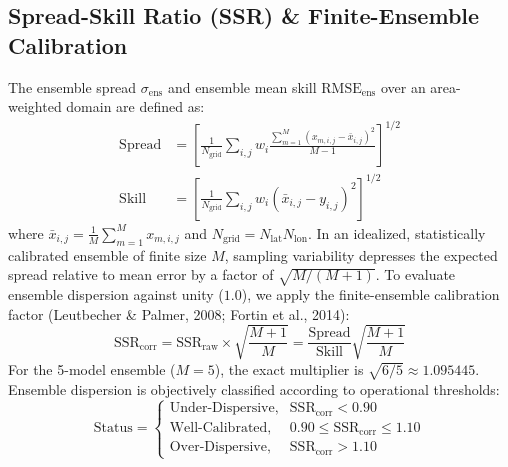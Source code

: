 \documentclass[10pt,twocolumn,letterpaper]{article}
\begin{document}
\subsection{Spread-Skill Ratio (SSR) \& Finite-Ensemble Calibration}
The ensemble spread $\sigma_\mathrm{ens}$ and ensemble mean skill $\mathrm{RMSE}_\mathrm{ens}$ over an area-weighted domain are defined as:
\begin{align}
\mathrm{Spread} &= \left[ \frac{1}{N_\mathrm{grid}} \sum_{i,j} w_i \frac{\sum_{m=1}^M (x_{m, i, j} - \bar{x}_{i,j})^2}{M-1} \right]^{1/2} \\
\mathrm{Skill} &= \left[ \frac{1}{N_\mathrm{grid}} \sum_{i,j} w_i (\bar{x}_{i,j} - y_{i,j})^2 \right]^{1/2}
\end{align}
where $\bar{x}_{i,j} = \frac{1}{M}\sum_{m=1}^M x_{m,i,j}$ and $N_\mathrm{grid} = N_\mathrm{lat} N_\mathrm{lon}$. In an idealized, statistically calibrated ensemble of finite size $M$, sampling variability depresses the expected spread relative to mean error by a factor of $\sqrt{M/(M+1)}$. To evaluate ensemble dispersion against unity ($1.0$), we apply the finite-ensemble calibration factor (Leutbecher \& Palmer, 2008; Fortin et al., 2014):
\begin{equation}
\mathrm{SSR}_\mathrm{corr} = \mathrm{SSR}_\mathrm{raw} \times \sqrt{\frac{M+1}{M}} = \frac{\mathrm{Spread}}{\mathrm{Skill}} \sqrt{\frac{M+1}{M}}
\label{eq:ssr_corr}
\end{equation}
For the 5-model ensemble ($M=5$), the exact multiplier is $\sqrt{6/5} \approx \mathbf{1.095445}$. Ensemble dispersion is objectively classified according to operational thresholds:
\begin{equation}
\text{Status} = \begin{cases}
\text{Under-Dispersive}, & \mathrm{SSR}_\mathrm{corr} < 0.90 \\
\text{Well-Calibrated}, & 0.90 \le \mathrm{SSR}_\mathrm{corr} \le 1.10 \\
\text{Over-Dispersive}, & \mathrm{SSR}_\mathrm{corr} > 1.10
\end{cases}
\end{equation}
\end{document}
